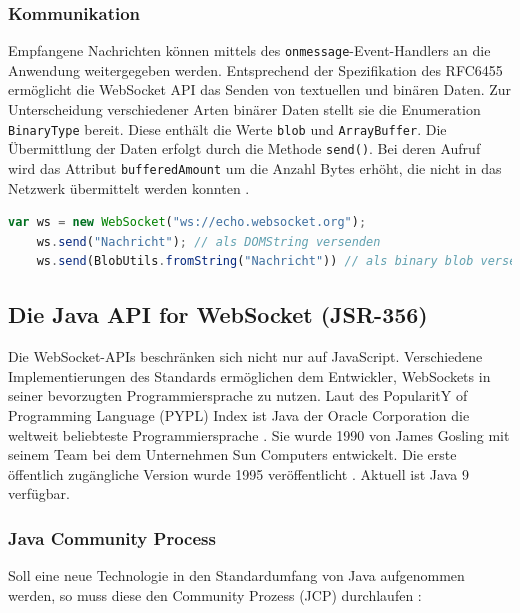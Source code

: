 \documentclass[11pt,a4paper,titlepage]{scrartcl}
\numberwithin{equation}{section}
\begin{document}
\subsubsection{Kommunikation}
Empfangene Nachrichten können mittels des \texttt{onmessage}-Event-Handlers an die Anwendung weitergegeben werden. Entsprechend der Spezifikation des RFC6455 ermöglicht die WebSocket API das Senden von textuellen und binären Daten. Zur Unterscheidung verschiedener Arten binärer Daten stellt sie die Enumeration \texttt{BinaryType} bereit. Diese enthält die Werte \texttt{blob} und \texttt{ArrayBuffer}. Die Übermittlung der Daten erfolgt durch die Methode \texttt{send()}. Bei deren Aufruf wird das Attribut \texttt{bufferedAmount} um die Anzahl Bytes erhöht, die nicht in das Netzwerk übermittelt werden konnten \autocite{whatwg_html_2010}. \\

\begin{lstlisting}[frame=single, language=JavaScript, caption=WebSocket Nachrichten senden]
	var ws = new WebSocket("ws://echo.websocket.org");
	ws.send("Nachricht"); // als DOMString versenden
	ws.send(BlobUtils.fromString("Nachricht")) // als binary blob versenden
\end{lstlisting}

\subsection{Die Java\texttrademark{} API for WebSocket (JSR-356)}
\noindent Die WebSocket-APIs beschränken sich nicht nur auf JavaScript. Verschiedene Implementierungen des Standards ermöglichen dem Entwickler, WebSockets in seiner bevorzugten Programmiersprache zu nutzen. Laut des PopularitY of Programming Language (PYPL) Index ist Java der Oracle Corporation die weltweit beliebteste Programmiersprache \autocite{cabonnelle_pypl_2017}. Sie wurde 1990 von James Gosling mit seinem Team bei dem Unternehmen Sun Computers entwickelt. Die erste öffentlich zugängliche Version wurde 1995 veröffentlicht \autocite{smyth_brief_2009}. Aktuell ist Java 9 verfügbar. 

\subsubsection*{Java Community Process}
Soll eine neue Technologie in den Standardumfang von Java aufgenommen werden, so muss diese den Community Prozess (JCP) durchlaufen \autocite{oracle_corporation_java_2017}: \\
\end{document}
